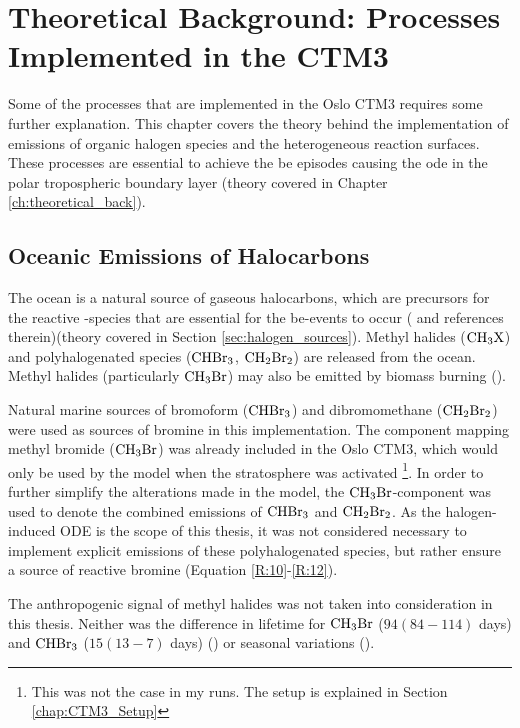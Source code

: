 \setcounter{chapter}{2} 
\chapter{Theoretical Background: Processes Implemented in the CTM3}\label{Chap:CTM3theory_ocean_hetReact}

Some of the processes that are implemented in the Oslo CTM3 requires some further explanation. This chapter covers the theory behind the implementation of emissions of organic halogen species and the heterogeneous reaction surfaces. These processes are essential to achieve the \acrfull{be} episodes causing the \acrfull{ode} in the polar tropospheric boundary layer (theory covered in Chapter \ref{ch:theoretical_back}).

\section{Oceanic Emissions of Halocarbons}\label{sec:oceanic_emissions}


The ocean is a natural source of gaseous halocarbons, which are precursors for the reactive -species that are essential for the \acrshort{be}-events to occur (\cite{Schmidt} and references therein)(theory covered in Section \ref{sec:halogen_sources}). Methyl halides ($\mathrm{CH_3X}$) and polyhalogenated species ($\mathrm{CHBr_3}$, $\mathrm{CH_2Br_2}$) are released from the ocean. Methyl halides (particularly $\mathrm{CH_3Br}$) may also be emitted by biomass burning (\cite{SeinfeldSpyros}). 

\medskip

Natural marine sources of bromoform ($\mathrm{CHBr_3}$) and dibromomethane ($\mathrm{CH_2Br_2}$) were used as sources of bromine in this implementation. The component mapping methyl bromide ($\mathrm{CH_3Br}$) was already included in the Oslo CTM3, which would only be used by the model when the stratosphere was activated \footnote{This was not the case in my runs. The setup is explained in Section \ref{chap:CTM3_Setup}}. In order to further simplify the alterations made in the model, the $\mathrm{CH_3Br}$-component was used to denote the combined emissions of $\mathrm{CHBr_3}$ and $\mathrm{CH_2Br_2}$. As the halogen-induced ODE is the scope of this thesis, it was not considered necessary to implement explicit emissions of these polyhalogenated species, but rather ensure a source of reactive bromine (Equation \ref{R:10}-\ref{R:12}).


\medskip

The anthropogenic signal of methyl halides was not taken into consideration in this thesis. Neither was the difference in lifetime for $\mathrm{CH_3Br}$ ($94 (84-114)$ days) and $\mathrm{CHBr_3}$ ($15 (13-7)$ days) (\cite{Hossaini2016_chlorine}) or seasonal variations (\cite{Liang2010}). 



